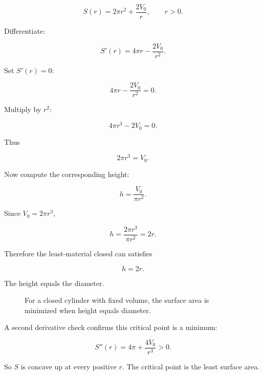 \[
S(r)=2\pi r^2+\frac{2V_0}{r},
\qquad r>0.
\]

Differentiate:

\[
S'(r)=4\pi r-\frac{2V_0}{r^2}.
\]

Set \(S'(r)=0\):

\[
4\pi r-\frac{2V_0}{r^2}=0.
\]

Multiply by \(r^2\):

\[
4\pi r^3-2V_0=0.
\]

Thus

\[
2\pi r^3=V_0.
\]

Now compute the corresponding height:

\[
h=\frac{V_0}{\pi r^2}.
\]

Since \(V_0=2\pi r^3\),

\[
h=\frac{2\pi r^3}{\pi r^2}=2r.
\]

Therefore the least-material closed can satisfies

\[
\boxed{
h=2r.
}
\]

The height equals the diameter.

\begin{figure}[h]
\centering
{}
\caption{For a closed cylinder with fixed volume, the surface area is minimized when height equals diameter.}
\label{fig:closed-can-min-area}
\end{figure}

A second derivative check confirms this critical point is a minimum:

\[
S''(r)=4\pi+\frac{4V_0}{r^3}>0.
\]

So \(S\) is concave up at every positive \(r\).  The critical point is the least surface area.

